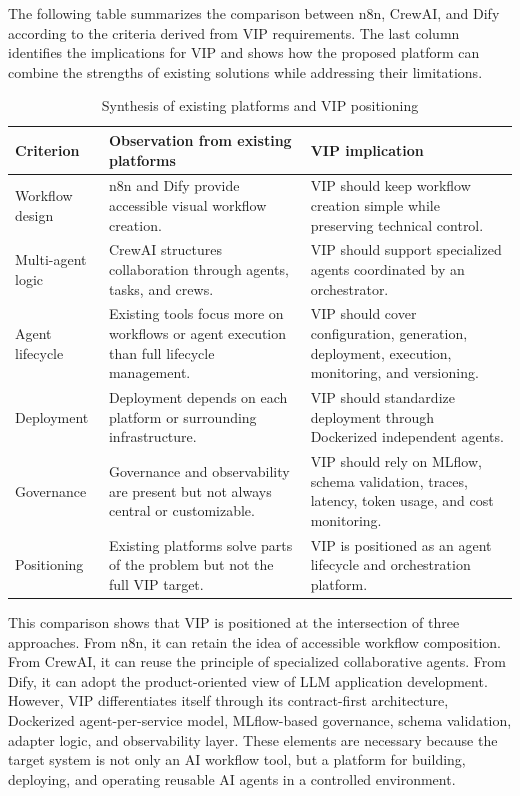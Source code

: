 The following table summarizes the comparison between n8n, CrewAI, and Dify according to the criteria derived from VIP requirements. The last column identifies the implications for VIP and shows how the proposed platform can combine the strengths of existing solutions while addressing their limitations.

\begin{table}[H]
\centering
\small
\caption{Synthesis of existing platforms and VIP positioning}
\label{tab:platform_comparison_compact}
\begin{tabular}{|p{3cm}|p{5.5cm}|p{6cm}|}
\hline
\textbf{Criterion} & \textbf{Observation from existing platforms} & \textbf{VIP implication} \\
\hline
Workflow design & n8n and Dify provide accessible visual workflow creation. & VIP should keep workflow creation simple while preserving technical control. \\
\hline
Multi-agent logic & CrewAI structures collaboration through agents, tasks, and crews. & VIP should support specialized agents coordinated by an orchestrator. \\
\hline
Agent lifecycle & Existing tools focus more on workflows or agent execution than full lifecycle management. & VIP should cover configuration, generation, deployment, execution, monitoring, and versioning. \\
\hline
Deployment & Deployment depends on each platform or surrounding infrastructure. & VIP should standardize deployment through Dockerized independent agents. \\
\hline
Governance & Governance and observability are present but not always central or customizable. & VIP should rely on MLflow, schema validation, traces, latency, token usage, and cost monitoring. \\
\hline
Positioning & Existing platforms solve parts of the problem but not the full VIP target. & VIP is positioned as an agent lifecycle and orchestration platform. \\
\hline
\end{tabular}
\end{table}

This comparison shows that VIP is positioned at the intersection of three approaches. From n8n, it can retain the idea of accessible workflow composition. From CrewAI, it can reuse the principle of specialized collaborative agents. From Dify, it can adopt the product-oriented view of LLM application development. However, VIP differentiates itself through its contract-first architecture, Dockerized agent-per-service model, MLflow-based governance, schema validation, adapter logic, and observability layer. These elements are necessary because the target system is not only an AI workflow tool, but a platform for building, deploying, and operating reusable AI agents in a controlled environment.

